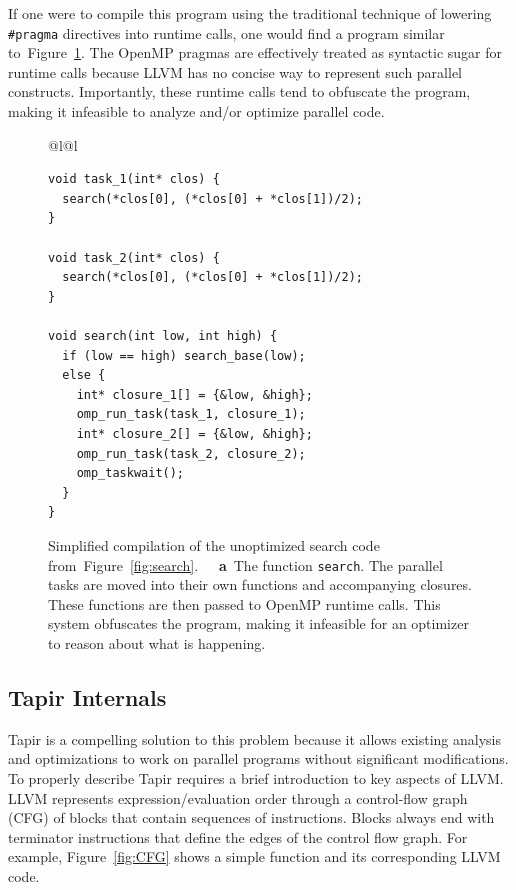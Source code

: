\documentclass[sigconf]{acmart}
\newcommand{\figref}[1]         {Figure~\ref{fig:#1}}
\newcommand{\subfigcap}[1]      {\textbf{~~#1}}
\def\code{\lstinline[basicstyle=\ttfamily\color{CodeColor}]}
\begin{document}
If one were to compile this program using the traditional technique of lowering 
\texttt{\#pragma} directives into runtime calls, one would find a program similar 
to~\figref{runtime_calls}.
The OpenMP pragmas are effectively treated as syntactic sugar for runtime calls
because LLVM has no concise way to represent such parallel constructs.
Importantly, these runtime calls tend to obfuscate the program, making it 
infeasible to analyze and/or optimize parallel code.

\begin{figure}[t]
\begin{tabular*}{\linewidth}{@{\extracolsep{\fill}}l@{}l}
\begin{lstlisting}
void task_1(int* clos) {
  search(*clos[0], (*clos[0] + *clos[1])/2);
}

void task_2(int* clos) {
  search(*clos[0], (*clos[0] + *clos[1])/2);
}

void search(int low, int high) {
  if (low == high) search_base(low);
  else {
    int* closure_1[] = {&low, &high};
    omp_run_task(task_1, closure_1);
    int* closure_2[] = {&low, &high};
    omp_run_task(task_2, closure_2);
    omp_taskwait();
  } 
}
\end{lstlisting}
\vspace{0.1ex}
\end{tabular*}

\caption[Simplified compilation of the unoptimized search code from \figref{search}.]
{Simplified compilation of the unoptimized search code from~\figref{search}.  
\subfigcap{a}~The function \code{search}. The parallel tasks are moved into their own 
functions and accompanying closures. These functions are then passed to OpenMP runtime 
calls. This system obfuscates the program, making it infeasible for an optimizer to 
reason about what is happening.}
  \label{fig:runtime_calls}
\end{figure}

\subsection{Tapir Internals}
Tapir is a compelling solution to this problem because it allows existing
analysis and optimizations to work on parallel programs without significant modifications.
To properly describe Tapir requires a brief introduction to key aspects of LLVM.
LLVM represents expression/evaluation order through a control-flow graph (CFG) of blocks that contain 
sequences of instructions. Blocks always end with terminator instructions that
define the edges of the control flow graph. For example, \figref{CFG} shows a simple
function and its corresponding LLVM code.
\end{document}
